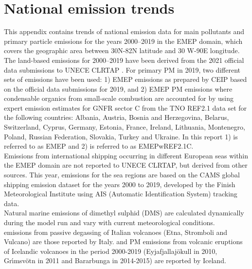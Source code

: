 \setcounter{page}{1}

\cleardoublepage
\chapter[Emission trends]{National emission trends}
\label{ch:appx_emis_trends}


This appendix contains trends of national emission data for main
pollutants and   primary particle emissions for the years
2000--2019 in the EMEP domain, which covers the geographic area between 30\degrees N-82\degrees N latitude and 30\degrees   
W-90\degrees E longitude.\\

The land-based emissions for 2000--2019  have been derived from the  2021 official data submissions to UNECE CLRTAP \citep{CEIP2021}.
For primary PM in 2019, two different sets of emissions have been used: 1) EMEP emissions as prepared by CEIP based on the official data submissions
for 2019, and 2) EMEP PM emissions where condensable organics from small-scale combustion are accounted for by using expert emission estimates for GNFR sector C from the
TNO REF2.1 data set for the following countries: Albania, Austria, Bosnia and Herzegovina,
Belarus, Switzerland, Cyprus, Germany, Estonia, France, Ireland, Lithuania, Montenegro,
Poland, Russian Federation, Slovakia, Turkey and Ukraine. In this report 1) is referred to as EMEP and 2) is referred to as EMEPwREF2.1C.\\

Emissions from international shipping occurring in different European seas within the EMEP domain are not reported to UNECE CLRTAP, but derived from other sources. This year, emissions for the sea regions are based on the CAMS global shipping emission dataset \citep{CAMSemis2019,ECCAD} for the years 2000 to 2019, developed by the Finish Meteorological Institute using AIS (Automatic Identification System) tracking data.\\

Natural marine emissions of dimethyl sulphid (DMS) are calculated dynamically during the model run and vary with current meteorological conditions.\\

\sox emissions from passive degassing of Italian volcanoes (Etna,
Stromboli and Vulcano) are those reported by
Italy. \sox and PM emissions from volcanic eruptions of Icelandic volcanoes in the period 2000-2019 (Eyjafjallaj\"okull in 2010, Gr{\'{\i}}msv{\"{o}}tn in 2011  and  Bar\dh{}arbunga in 2014-2015) are reported by Iceland.  \\


